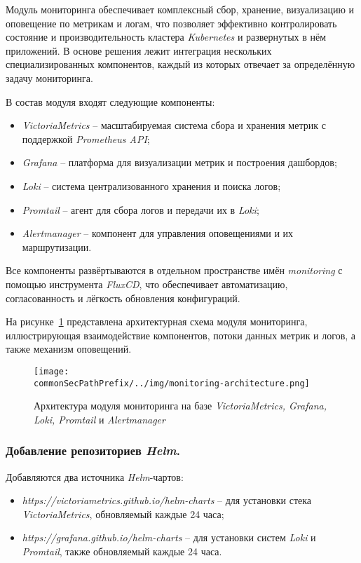 Модуль мониторинга обеспечивает комплексный сбор, хранение, визуализацию и оповещение по метрикам и логам, что позволяет эффективно контролировать состояние и производительность кластера \textit{Kubernetes} и развернутых в нём приложений. В основе решения лежит интеграция нескольких специализированных компонентов, каждый из которых отвечает за определённую задачу мониторинга.

В состав модуля входят следующие компоненты:

\begin{itemize}
    \item \textit{VictoriaMetrics}\cite{victoriametrics} -- масштабируемая система сбора и хранения метрик с поддержкой \textit{Prometheus API};
    \item \textit{Grafana} -- платформа для визуализации метрик и построения дашбордов;
    \item \textit{Loki}\cite{loki} -- система централизованного хранения и поиска логов;
    \item \textit{Promtail} -- агент для сбора логов и передачи их в \textit{Loki};
    \item \textit{Alertmanager} -- компонент для управления оповещениями и их маршрутизации.
\end{itemize}

Все компоненты развёртываются в отдельном пространстве имён \textit{monitoring} с помощью инструмента \textit{FluxCD}, что обеспечивает автоматизацию, согласованность и лёгкость обновления конфигураций.

На рисунке~\ref{fig:monitoring-architecture} представлена архитектурная схема модуля мониторинга, иллюстрирующая взаимодействие компонентов, потоки данных метрик и логов, а также механизм оповещений.

\begin{figure}[ht]
    \centering
    \texttt{[image: \\commonSecPathPrefix/../img/monitoring-architecture.png]}
    \caption{Архитектура модуля мониторинга на базе \textit{VictoriaMetrics, Grafana, Loki, Promtail} и \textit{Alertmanager}}
    \label{fig:monitoring-architecture}
\end{figure}

\subsubsection{Добавление репозиториев \textit{Helm}.} Добавляются два источника \textit{Helm}-чартов:

\begin{itemize}
    \item \textit{https://victoriametrics.github.io/helm-charts} -- для установки стека \textit{VictoriaMetrics}, обновляемый каждые 24 часа;
    \item \textit{https://grafana.github.io/helm-charts} -- для установки систем \textit{Loki} и \textit{Promtail}, также обновляемый каждые 24 часа.
\end{itemize}

